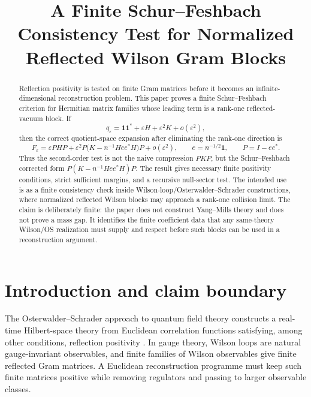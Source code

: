 \documentclass[11pt]{article}
\title{A Finite Schur--Feshbach Consistency Test for Normalized Reflected Wilson Gram Blocks}
\author{}
\date{}
\newcommand{\one}{\mathbf 1}
\newcommand{\eps}{\varepsilon}
\begin{document}
\maketitle

\begin{abstract}
Reflection positivity is tested on finite Gram matrices before it becomes an infinite-dimensional reconstruction problem.  This paper proves a finite Schur--Feshbach criterion for Hermitian matrix families whose leading term is a rank-one reflected-vacuum block.  If
\[
q_\eps=\one\one^*+\eps H+\eps^2K+o(\eps^2),
\]
then the correct quotient-space expansion after eliminating the rank-one direction is
\[
F_\eps
=\eps PHP+
\eps^2P\bigl(K-n^{-1}Hee^*H\bigr)P+o(\eps^2),
\qquad e=n^{-1/2}\one,
\qquad P=I-ee^*.
\]
Thus the second-order test is not the naive compression \(PKP\), but the Schur--Feshbach corrected form \(P(K-n^{-1}Hee^*H)P\).  The result gives necessary finite positivity conditions, strict sufficient margins, and a recursive null-sector test.  The intended use is as a finite consistency check inside Wilson-loop/Osterwalder--Schrader constructions, where normalized reflected Wilson blocks may approach a rank-one collision limit.  The claim is deliberately finite: the paper does not construct Yang--Mills theory and does not prove a mass gap.  It identifies the finite coefficient data that any same-theory Wilson/OS realization must supply and respect before such blocks can be used in a reconstruction argument.
\end{abstract}

\tableofcontents

\section{Introduction and claim boundary}

The Osterwalder--Schrader approach to quantum field theory constructs a real-time Hilbert-space theory from Euclidean correlation functions satisfying, among other conditions, reflection positivity \cite{OsterwalderSchrader1973,OsterwalderSchrader1975}.  In gauge theory, Wilson loops are natural gauge-invariant observables, and finite families of Wilson observables give finite reflected Gram matrices.  A Euclidean reconstruction programme must keep such finite matrices positive while removing regulators and passing to larger observable classes.
\end{document}
